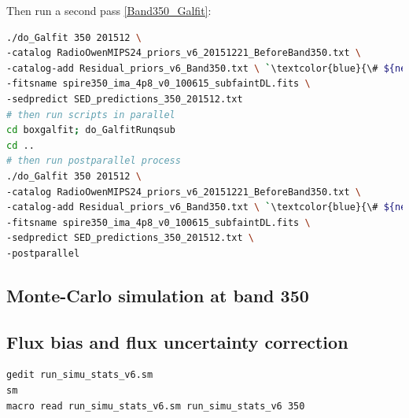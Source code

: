 \documentclass[11pt,a4paper]{article}
\begin{document}
Then run a second pass \ref{Band350_Galfit}: 

\begin{lstlisting}[language=bash]
./do_Galfit 350 201512 \
-catalog RadioOwenMIPS24_priors_v6_20151221_BeforeBand350.txt \
-catalog-add Residual_priors_v6_Band350.txt \ `\textcolor{blue}{\# ${new!}$}`
-fitsname spire350_ima_4p8_v0_100615_subfaintDL.fits \
-sedpredict SED_predictions_350_201512.txt
# then run scripts in parallel 
cd boxgalfit; do_GalfitRunqsub
cd ..
# then run postparallel process
./do_Galfit 350 201512 \
-catalog RadioOwenMIPS24_priors_v6_20151221_BeforeBand350.txt \
-catalog-add Residual_priors_v6_Band350.txt \ `\textcolor{blue}{\# ${new!}$}`
-fitsname spire350_ima_4p8_v0_100615_subfaintDL.fits \
-sedpredict SED_predictions_350_201512.txt \
-postparallel
\end{lstlisting}

\subsection{Monte-Carlo simulation at band 350}
\label{Band350_Galsim}

\subsection{Flux bias and flux uncertainty correction}
\label{Band350_dfcorr}

\begin{lstlisting}[language=bash]
gedit run_simu_stats_v6.sm
sm
macro read run_simu_stats_v6.sm run_simu_stats_v6 350
\end{lstlisting}
\end{document}
